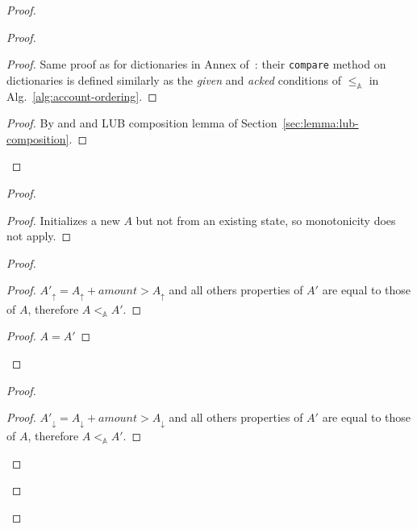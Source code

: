 \documentclass[9pt, oneside]{article}   	%
\begin{document}
\begin{proof}
\begin{proof}
			\begin{proof}
				Same proof as for dictionaries in Annex of~\cite{lavoie2023statebased}: their \texttt{compare} method on dictionaries is defined similarly as the  \textit{given} and \textit{acked} conditions of $\leq_\mathds{A}$ in Alg.~\ref{alg:account-ordering}.
			\end{proof}
			
			\qedstep
			\begin{proof}
				By  and  and LUB composition lemma of Section~\ref{sec:lemma:lub-composition}.
			\end{proof}
		\end{proof}

	
	\begin{proof}
		\begin{proof}
			Initializes a new $A$ but not from an existing state, so monotonicity does not apply.
		\end{proof}
		
		\begin{proof}
			\begin{proof}
				$A'_\uparrow = A_\uparrow + \textit{amount} > A_\uparrow$ and all others properties of $A'$ are equal to those of $A$, therefore $A <_\mathds{A} A'$.
			\end{proof}
			
			\begin{proof}
				$A=A'$
			\end{proof}
		\end{proof}
		
		\begin{proof}
			\begin{proof}
				$A'_\downarrow = A_\downarrow + \textit{amount} > A_\downarrow$ and all others properties of $A'$ are equal to those of $A$, therefore $A <_\mathds{A} A'$. 
			\end{proof}
			

\end{proof}
\end{proof}
\end{proof}
\end{document}
